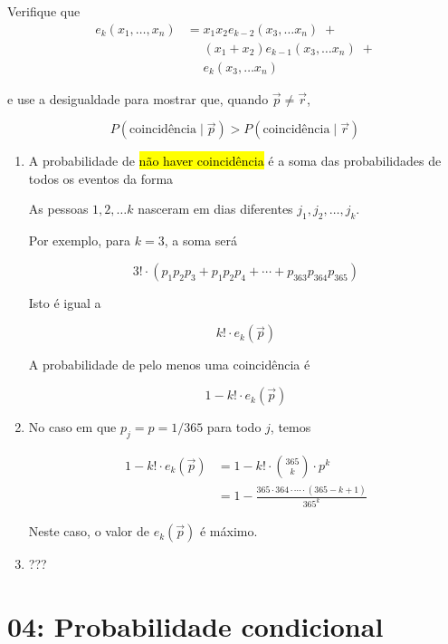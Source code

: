 \documentclass[
  11pt]{report}
\begin{document}
\begin{rmdbox}
\begin{enumerate}
  Verifique que
  \[
  \begin{aligned}
    e_k(x_1, \ldots, x_n)
    &=
    x_1 x_2 e_{k-2}(x_3, \ldots x_n) \;+ \\
    &\phantom{{}={}} (x_1 + x_2) e_{k-1}(x_3, \ldots x_n) \;+ \\
    &\phantom{{}={}} e_{k}(x_3, \ldots x_n)
  \end{aligned}
  \]

  e use a desigualdade para mostrar que, quando $\vec p \neq \vec r$,

  \[
  P( \text{coincidência} \mid \vec p) 
  >
  P( \text{coincidência} \mid \vec r)
  \]
\end{enumerate}

\end{rmdbox}

\begin{enumerate}
\def\labelenumi{\alph{enumi}.}
\item
  A probabilidade de {\hl{não haver coincidência}} é a soma das probabilidades de todos os eventos da forma

  \begin{rmdbox}
  As pessoas $1, 2, \ldots k$ nasceram em dias diferentes $j_1, j_2, \ldots, j_k$.

  \end{rmdbox}

  Por exemplo, para $k = 3$, a soma será

  \[
  3! \cdot (p_1 p_2 p_3 + p_1 p_2 p_4 + \cdots + p_{363} p_{364} p_{365})
  \]

  Isto é igual a

  \[
  k! \cdot e_k(\vec p)
  \]

  A probabilidade de pelo menos uma coincidência é

  \[
  1 - k! \cdot e_k(\vec p)
  \]
\item
  No caso em que $p_j = p = 1/365$ para todo $j$, temos

  \[
  \begin{aligned}
    1 - k! \cdot e_k(\vec p) 
    &=
    1 - k! \cdot \binom{365}{k} \cdot p^k \\
    &=
    1 - \frac{365 \cdot 364 \cdot \cdots \cdot (365 - k + 1)}{365^k}
  \end{aligned}
  \]

  Neste caso, o valor de $e_k(\vec p)$ é máximo.
\item
  ???
\end{enumerate}

\hypertarget{probabilidade-condicional}{%
\chapter*{04: Probabilidade condicional}\label{probabilidade-condicional}}
\end{document}
